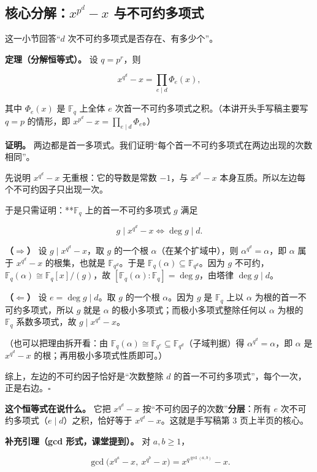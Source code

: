 \subsection{核心分解：$x^{p^d}-x$ 与不可约多项式}


这一小节回答“$d$ 次不可约多项式是否存在、有多少个”。

\textbf{定理（分解恒等式）。} 设 $q=p^r$，则

\[
x^{q^d}-x=\prod_{e\mid d}\Phi_e(x),
\]

其中 $\Phi_e(x)$ 是 $\mathbb F_q$ 上全体 $e$ 次首一不可约多项式之积。（本讲开头手写稿主要写 $q=p$ 的情形，即 $x^{p^d}-x=\prod_{e\mid d}\Phi_e$。）

\textbf{证明。} 两边都是首一多项式。我们证明“每个首一不可约多项式在两边出现的次数相同”。

先说明 $x^{q^d}-x$ 无重根：它的导数是常数 $-1$，与 $x^{q^d}-x$ 本身互质。所以左边每个不可约因子只出现一次。

于是只需证明：**$\mathbb F_q$ 上的首一不可约多项式 $g$ 满足

\[
g\mid x^{q^d}-x\iff \deg g\mid d.
\]

\textbf{（$\Rightarrow$）} 设 $g\mid x^{q^d}-x$，取 $g$ 的一个根 $\alpha$（在某个扩域中），则 $\alpha^{q^d}=\alpha$，即 $\alpha$ 属于 $x^{q^d}-x$ 的根集，也就是 $\mathbb F_{q^d}$。于是 $\mathbb F_q(\alpha)\subseteq\mathbb F_{q^d}$。因为 $g$ 不可约，$\mathbb F_q(\alpha)\cong\mathbb F_q[x]/(g)$，故 $[\mathbb F_q(\alpha):\mathbb F_q]=\deg g$，由塔律 $\deg g\mid d$。

\textbf{（$\Leftarrow$）} 设 $e=\deg g\mid d$。取 $g$ 的一个根 $\alpha$。因为 $g$ 是 $\mathbb F_q$ 上以 $\alpha$ 为根的首一不可约多项式，所以 $g$ 就是 $\alpha$ 的极小多项式；而极小多项式整除任何以 $\alpha$ 为根的 $\mathbb F_q$ 系数多项式，故 $g\mid x^{q^d}-x$。

（也可以把理由拆开看：由 $\mathbb F_q(\alpha)\cong\mathbb F_{q^e}\subseteq\mathbb F_{q^d}$（子域判据）得 $\alpha^{q^d}=\alpha$，即 $\alpha$ 是 $x^{q^d}-x$ 的根；再用极小多项式性质即可。）

综上，左边的不可约因子恰好是“次数整除 $d$ 的首一不可约多项式”，每个一次，正是右边。$\square$

\textbf{这个恒等式在说什么。} 它把 $x^{q^d}-x$ 按“不可约因子的次数”\textbf{分层}：所有 $e$ 次不可约多项式（$e\mid d$）之积，恰好等于 $x^{q^d}-x$。这就是手写稿第 3 页上半页的核心。

\textbf{补充引理（gcd 形式，课堂提到）。} 对 $a,b\ge1$，

\[
\gcd\bigl(x^{q^a}-x,\ x^{q^b}-x\bigr)=x^{q^{\gcd(a,b)}}-x .
\]


